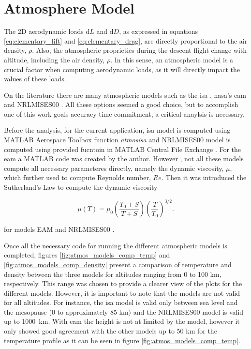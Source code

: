 \section{Atmosphere Model}
\label{section:atmosphere_model}

The 2D aerodynamic loads $\mathrm{d}L$ and  $\mathrm{d}D$, as expressed in equations \ref{eq:elementary_lift} and \ref{eq:elementary_drag}, are directly proportional to the air density, $\rho$. Also, the atmospheric proprieties during the descent flight change with altitude, including the air density, $\rho$. In this sense, an atmospheric model is a crucial factor when computing aerodynamic loads, as it will directly impact the values of these loads. 

On the literature there are many atmospheric models such as the \gls{isa} \cite{noauthor_iso_nodate}, \gls{nasa}'s \gls{eam} \cite{noauthor_earth_nodate} and NRLMISES00 \cite{picone_nrlmsise00_2002}. All these options seemed a good choice, but to accomplish one of  this work goals accuracy-time commitment, a critical anaylsis is necessary.

Before the analysis, for the current application, \gls{isa} model is computed using MATLAB \cite{matlab_version_2024} Aerospace Toolbox \cite{noauthor_aerospace_nodate} function \textit{atmosisa} \cite{noauthor_atmosisa_nodate} and NRLMISES00 model is computed using provided fucntoin in MATLAB \cite{matlab_version_2024} Central File Exchange \cite{noauthor_atmosphere_2025}. For the \gls{eam} a MATLAB \cite{matlab_version_2024} code was created by the author. However , not all these models compute all necessary parameteres directly, namely the dynamic viscosity, $\mu$, which further used to compute Reynolds number, $Re$. Then it was introduced the Sutherland's Law to compute the dynamic viscosity

\begin{equation}
    \mu(T) = \mu_0 \left( \frac{T_0 + S}{T + S} \right) \left( \frac{T}{T_0} \right)^{3/2}.
\end{equation}

\noindent for models EAM \cite {noauthor_earth_nodate, noauthor_atmosisa_nodate} and NRLMISES00 \cite{picone_nrlmsise00_2002, noauthor_atmosphere_2025}.

Once all the necessary code for running the different atmospheric models is completed, figures \ref{fig:atmos_models_comp_temp} and \ref{fig:atmos_models_comp_density} present a comparison of temperature and density between the three models for altitudes ranging from 0 to 100 \unit{\km}, respectively. This range was chosen to provide a clearer view of the plots for the different models. However, it is important to note that the models are not valid for all altitudes. For instance, the \gls{isa} model is valid only between sea level and the mesopause (0 to approximately 85 \unit{\km}) and the NRLMISES00 model is valid up to 1000~\unit{\km}. With \gls{eam} the height is not at limited by the model, however it only showed good agreement with the other models up to 50 \unit{\km} for the temperature profile as it can be seen in figure \ref{fig:atmos_models_comp_temp}.


